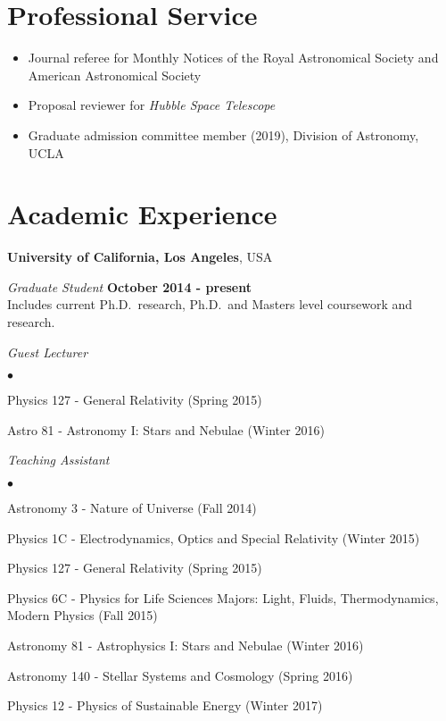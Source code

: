 \documentclass[margin, line]{res}
\newenvironment{list2}{
  \begin{list}{$\bullet$}{%
      \setlength{\itemsep}{0in}
      \setlength{\parsep}{0in} \setlength{\parskip}{0in}
      \setlength{\topsep}{0in} \setlength{\partopsep}{0in} 
      \setlength{\leftmargin}{0.2in}}}{\end{list}}
\begin{document}
\begin{resume}
\section{\sc Professional Service}
\begin{itemize}
\item Journal referee for Monthly Notices of the Royal Astronomical Society and American Astronomical Society
\item Proposal reviewer for \textit{Hubble Space Telescope}
\item Graduate admission committee member (2019), Division of Astronomy, UCLA
\end{itemize}

\section{\sc Academic Experience}
{\bf University of California, Los Angeles}, USA

\vspace{-.3cm}
{\em Graduate Student} \hfill {\bf October 2014 - present}\\
Includes current Ph.D.~research, Ph.D.~and Masters level coursework and
research.


{\em Guest Lecturer} \hfill {\bf}\\
\begin{list2}
	\item Physics 127 - General Relativity (Spring 2015)
	\item Astro 81 - Astronomy I: Stars and Nebulae (Winter 2016)
\end{list2}
	
{\em Teaching Assistant} \hfill {}\\
\begin{list2}
	\item Astronomy 3 - Nature of Universe (Fall 2014)
	\item Physics 1C - Electrodynamics, Optics and Special Relativity (Winter 2015)
	\item Physics 127 - General Relativity (Spring 2015)
	\item Physics 6C - Physics for Life Sciences Majors: Light, Fluids, Thermodynamics, Modern Physics (Fall 2015)
	\item Astronomy 81 - Astrophysics I: Stars and Nebulae (Winter 2016)
	\item Astronomy 140 - Stellar Systems and Cosmology (Spring 2016)
	\item Physics 12 - Physics of Sustainable Energy (Winter 2017)
\end{list2}


\end{resume}
\end{document}

